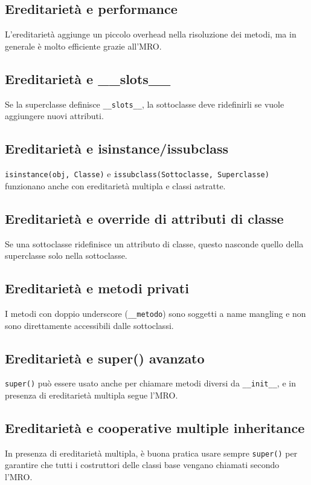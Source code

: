 \documentclass[a4paper,12pt]{article}
\begin{document}
\subsection*{Ereditarietà e performance}
L'ereditarietà aggiunge un piccolo overhead nella risoluzione dei metodi, ma in generale è molto efficiente grazie all'MRO.

\subsection*{Ereditarietà e \_\_slots\_\_}
Se la superclasse definisce \texttt{\_\_slots\_\_}, la sottoclasse deve ridefinirli se vuole aggiungere nuovi attributi.

\subsection*{Ereditarietà e isinstance/issubclass}
\texttt{isinstance(obj, Classe)} e \texttt{issubclass(Sottoclasse, Superclasse)} funzionano anche con ereditarietà multipla e classi astratte.

\subsection*{Ereditarietà e override di attributi di classe}
Se una sottoclasse ridefinisce un attributo di classe, questo nasconde quello della superclasse solo nella sottoclasse.

\subsection*{Ereditarietà e metodi privati}
I metodi con doppio underscore (\texttt{\_\_metodo}) sono soggetti a name mangling e non sono direttamente accessibili dalle sottoclassi.

\subsection*{Ereditarietà e super() avanzato}
\texttt{super()} può essere usato anche per chiamare metodi diversi da \texttt{\_\_init\_\_}, e in presenza di ereditarietà multipla segue l'MRO.

\subsection*{Ereditarietà e cooperative multiple inheritance}
In presenza di ereditarietà multipla, è buona pratica usare sempre \texttt{super()} per garantire che tutti i costruttori delle classi base vengano chiamati secondo l'MRO.
\end{document}
